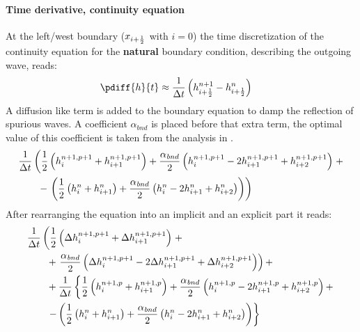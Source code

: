 \paragraph*{Time derivative, continuity equation}
At the left/west boundary ($x_{i+\frac{1}{2}}$ with $i=0$) the time discretization of the continuity equation for the \textbf{natural} boundary condition, describing the outgoing wave, reads:
\begin{align}
    \pdiff{h}{t} & \approx \frac{1}{\Dt} \left(  h^{n+1}_{i+\half} - h^{n}_{i+\half} \right)
\end{align}
A diffusion like term is added to the boundary equation to damp the reflection of spurious waves.
A coefficient $\alpha_{\mathit bnd}$ is placed before that extra term, the optimal value of this coefficient is taken from the analysis in \citet{transpeq-analysisdiscretizationinsidedomain_boundaries.mw}.
\begin{align}
    & \frac{1}{\Delta t}\left( \frac{1}{2} \left( h^{n+1,p+1}_{i} + h^{n+1,p+1}_{i+1} \right)
    + \frac{\alpha_{\mathit bnd}}{2} \left( h^{n+1,p+1}_{i} - 2 h^{n+1,p+1}_{i+1} + h^{n+1,p+1}_{i+2}  \right) \right. +
    \nonumber \\*
    & \qquad  - \left. \left(
    \frac{1}{2} \left( h^{n}_{i} + h^{n}_{i+1} \right)
    + \frac{\alpha_{\mathit bnd}}{2}  \left( h^{n}_{i} - 2 h^{n}_{i+1} + h^{n}_{i+2}  \right) \right)
    \right)
\end{align}
After rearranging the equation into an implicit and an explicit part it reads:
\begin{align}
    & \frac{1}{\Delta t}  \left( \frac{1}{2} \left( \Delta h^{n+1, p+1}_{i} + \Delta h^{n+1, p+1}_{i+1} \right) \right. +
    \nonumber \\*
    & \qquad + \left. \frac{\alpha_{\mathit bnd}}{2}\left( \Delta h^{n+1,p+1}_{i} - 2 \Delta h^{n+1,p+1}_{i+1} + \Delta h^{n+1,p+1}_{i+2} \right) \right) +
    \nonumber \\
    & \qquad + \frac{1}{\Delta t} \left\{ \frac{1}{2} \left( h^{n+1, p}_{i} + h^{n+1, p}_{i+1} \right)
    + \frac{\alpha_{\mathit bnd}}{2}\left(  h^{n+1,p}_{i} - 2 h^{n+1,p}_{i+1}  + h^{n+1,p}_{i+2} \right) + \right.
    \nonumber \\*
    &
    \qquad \left. - \left( \frac{1}{2} \left( h^{n}_{i} + h^{n}_{i+1} \right)
    + \frac{\alpha_{\mathit bnd}}{2}  \left( h^{n}_{i} - 2 h^{n}_{i+1} + h^{n}_{i+2}  \right) \right) \right\}
\end{align}

